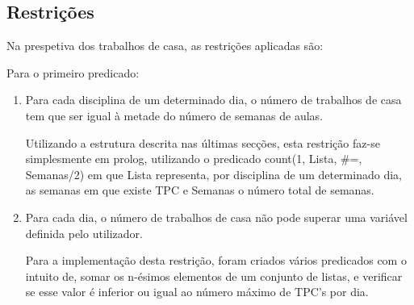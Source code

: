 \documentclass{llncs}
\begin{document}
\subsection{Restrições}

Na prespetiva dos trabalhos de casa, as restrições aplicadas são:

Para o primeiro predicado:
\begin{enumerate}
\item Para cada disciplina de um determinado dia, o número de trabalhos de casa tem que ser igual à metade do número de semanas de aulas.

Utilizando a estrutura descrita nas últimas secções, esta restrição faz-se simplesmente em prolog, utilizando o predicado count(1, Lista, \#=, Semanas/2) em que Lista representa, por disciplina de um determinado dia, as semanas em que existe TPC e Semanas o número total de semanas.

\item Para cada dia, o número de trabalhos de casa não pode superar uma variável definida pelo utilizador.

Para a implementação desta restrição, foram criados vários predicados com o intuito de, somar os n-ésimos elementos de um conjunto de listas, e verificar se esse valor é inferior ou igual ao número máximo de TPC's por dia.
\end{enumerate}
\end{document}
